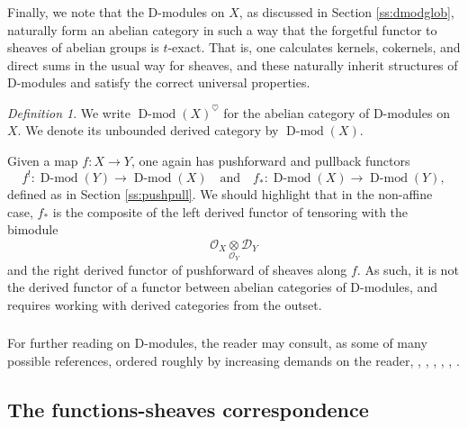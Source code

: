 \documentclass[10pt]{amsart}
\newcommand{\on}{\operatorname}
\newcommand{\Dmod}{\on{D-mod}}
\theoremstyle{remark}
\newtheorem{defn}[subsubsection]{Definition}
\newcommand{\sD}{\mathscr{D}}
\numberwithin{equation}{section}
\newcommand{\sO}{\mathscr{O}}
\begin{document}
	\label{ss:dmodglob}
	\subsubsection{}  Finally, we note that the D-modules on $X$, as discussed 
	in Section \ref{ss:dmodglob}, naturally form an abelian category in such a 
	way that the forgetful functor to sheaves of abelian groups is $t$-exact. That is, one calculates kernels, cokernels, and direct sums in the usual way 
	for sheaves, and these naturally inherit structures of D-modules and 
	satisfy the correct universal properties. 
	
	\begin{defn} We write $\on{D-mod}(X)^\heartsuit$ for the abelian category 
	of D-modules on $X$. We denote its unbounded derived category by 
	$\on{D-mod}(X)$.  
	\end{defn}
	
	Given a map $f: X \rightarrow Y$, one again has pushforward and pullback functors 
	\[ f^!: \Dmod(Y) \rightarrow \Dmod(X) \quad \text{and} \quad f_*: \Dmod(X) \rightarrow \Dmod(Y), \]
	defined as in Section \ref{ss:pushpull}. We should highlight that in the non-affine case, $f_*$ is the composite of the left derived functor of tensoring with the bimodule $$\sO_X \underset{\sO_Y}{\otimes} \sD_Y$$and the right derived functor of pushforward of sheaves along $f$. As such, it is not the derived functor of a functor between abelian categories of D-modules, and requires working with derived categories from the outset. 
	
	\subsubsection{} 	For further reading on D-modules, the reader may consult, as some of many possible references, ordered roughly by increasing demands on the reader,  \cite{coutinho}, \cite{arkhipovnotes},  \cite{bernsteinnotes}, \cite{kashiwarabookd-modules}, \cite{gaitsgorynotes}, \cite{hottatakeuchitanisaki}. 
	

	
	\subsection{The functions-sheaves correspondence}
	
		\subsubsection{}
	
\end{document}
